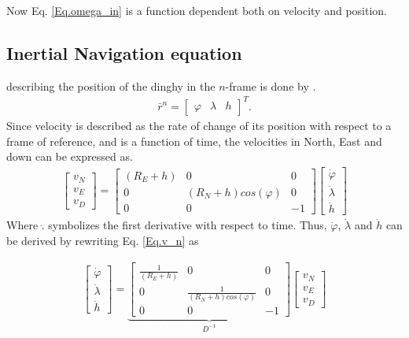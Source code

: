 Now Eq. \eqref{Eq.omega_in} is a function dependent both on velocity and position.

\subsection*{Inertial Navigation equation}
describing the position of the dinghy in the $n$-frame is done by \cite{nonlinear}.
\begin{align}
\bar{r}^n=
\begin{bmatrix}
\varphi & \lambda & h
\end{bmatrix}^T.
\end{align}
Since velocity is described as the rate of change of its position with respect to a frame of reference, and is a function of time, the velocities in North, East and down can be expressed as.
\begin{align}
\begin{bmatrix}
v_N \\
v_E \\
v_D
\end{bmatrix}
=
\begin{bmatrix}
(R_E+h) & 0 & 0 \\
0 & (R_N+h)cos(\varphi) & 0\\
0 & 0 & -1
\end{bmatrix}
\begin{bmatrix}
\dot{\varphi}\\
\dot{\lambda}\\
\dot{h}
\end{bmatrix}
\label{Eq.v_n}
\end{align}
Where $\dot{.}$ symbolizes the first derivative with respect to time. Thus, $\dot{\varphi}$, $\dot{\lambda}$ and $\dot{h}$ can be derived by rewriting Eq. \eqref{Eq.v_n} as

\begin{align}
\begin{bmatrix}
\dot{\varphi}\\
\dot{\lambda}\\
\dot{h}
\end{bmatrix}
=
\underbrace{\begin{bmatrix}
\frac{1}{(R_E+h)} & 0 & 0 \\
0 & \frac{1}{(R_N+h)cos(\varphi)} & 0\\
0 & 0 & -1
\end{bmatrix}}_{D^{-1}}
\begin{bmatrix}
v_N \\
v_E \\
v_D
\end{bmatrix}
\label{Eq.v_n}
\end{align}

